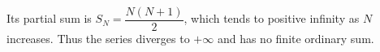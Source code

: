 Its partial sum is $S_N=\dfrac{N(N+1)}{2}$, which tends to positive infinity as $N$ increases. Thus the series diverges to $+\infty$ and has no finite ordinary sum.
